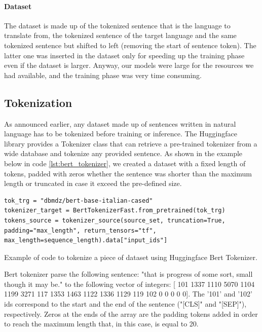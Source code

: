 \paragraph{Dataset} The dataset is made up of the tokenized sentence that is the language to translate from, the tokenized sentence of the target language and the same tokenized sentence but shifted to left (removing the start of sentence token). The latter one was inserted in the dataset only for speeding up the training phase even if the dataset is larger. Anyway, our models were large for the resources we had available, and the training phase was very time consuming.

\subsection{Tokenization}
As announced earlier, any dataset made up of sentences written in natural language has to be tokenized before training or inference. The Huggingface library provides a Tokenizer class that can retrieve a pre-trained tokenizer from a wide database and tokenize any provided sentence. As shown in the example below in code \ref{lst:bert_tokenizer}, we created a dataset with a fixed length of tokens, padded with zeros whether the sentence was shorter than the maximum length or truncated in case it exceed the pre-defined size.
\begin{listing}[H]
\begin{verbatim}
tok_trg = "dbmdz/bert-base-italian-cased"
tokenizer_target = BertTokenizerFast.from_pretrained(tok_trg) 
tokens_source = tokenizer_source(source_set, truncation=True,                      padding="max_length", return_tensors="tf",                         max_length=sequence_length).data["input_ids"]
\end{verbatim}
\caption{Example of code to tokenize a piece of dataset using Huggingface Bert Tokenizer.}
\label{lst:bert_tokenizer}
\end{listing}
\begin{exmp}
Bert tokenizer parse the following sentence: "that is progress of some sort, small though it may be." to the following vector of integers: [ 101 1337 1110 5070 1104 1199 3271  117 1353 1463 1122 1336 1129 119 102 0 0 0 0 0]. The '101' and '102' ids correspond to the start and the end of the sentence ("[CLS]" and "[SEP]"), respectively. Zeros at the ends of the array are the padding tokens added in order to reach the maximum length that, in this case, is equal to 20.
\end{exmp}

